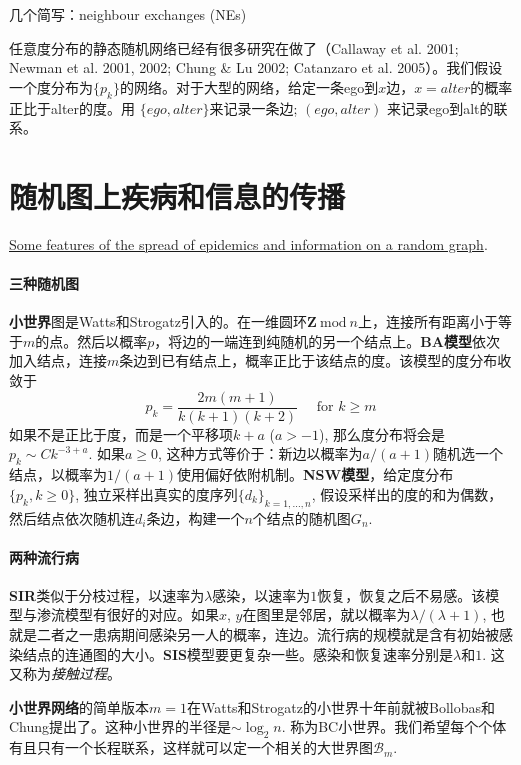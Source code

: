 几个简写：neighbour exchanges (NEs)

任意度分布的静态随机网络已经有很多研究在做了（Callaway et al. 2001; Newman et al. 2001, 2002; Chung \& Lu 2002; Catanzaro et al. 2005）。我们假设一个度分布为$\{p_k\}$的网络。对于大型的网络，给定一条ego到$x$边，$x=alter$的概率正比于alter的度。用 $\{ego, alter\}$来记录一条边; $(ego, alter)$ 来记录ego到alt的联系。

\section{随机图上疾病和信息的传播}

\href{https://www.pnas.org/content/pnas/107/10/4491.full.pdf}{Some features of the spread of epidemics and information on a random graph}. 

\paragraph{三种随机图}\textbf{小世界}图是Watts和Strogatz引入的。在一维圆环$\mathbf{Z} ~\text{mod}~n$上，连接所有距离小于等于$m$的点。然后以概率$p$，将边的一端连到纯随机的另一个结点上。\textbf{BA模型}依次加入结点，连接$m$条边到已有结点上，概率正比于该结点的度。该模型的度分布收敛于\begin{equation} p_{k}=\frac{2 m(m+1)}{k(k+1)(k+2)} \quad \text { for } k \geq m \end{equation}如果不是正比于度，而是一个平移项$k+a$ {($a>-1$)}, 那么度分布将会是$p_k\sim C k^{-3+a}$. 如果$a\geq 0$, 这种方式等价于：新边以概率为$a/(a+1)$随机选一个结点，以概率为$1/(a+1)$使用偏好依附机制。\textbf{NSW模型}，给定度分布$\{p_k,k\geq 0\}$, 独立采样出真实的度序列$\{d_k\}_{k=1,\dots, n}$, 假设采样出的度的和为偶数，然后结点依次随机连$d_i$条边，构建一个$n$个结点的随机图$G_{n}$. 

\paragraph{两种流行病}\textbf{SIR}类似于分枝过程，以速率为$\lambda$感染，以速率为$1$恢复，恢复之后不易感。该模型与渗流模型有很好的对应。如果$x$, $y$在图里是邻居，就以概率为$\lambda/(\lambda+1)$, 也就是二者之一患病期间感染另一人的概率，连边。流行病的规模就是含有初始被感染结点的连通图的大小。\textbf{SIS}模型要更复杂一些。感染和恢复速率分别是$\lambda$和$1$. 这又称为\textit{接触过程}。

\textbf{小世界网络}的简单版本$m=1$在Watts和Strogatz的小世界十年前就被Bollobas和Chung提出了。这种小世界的半径是$\sim\log_2 n$. 称为BC小世界。我们希望每个个体有且只有一个长程联系，这样就可以定一个相关的大世界图$\mathscr{B}_m$. 

